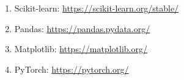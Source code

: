 \documentclass[12pt, a4paper]{article}
\begin{document}
\begin{enumerate}
  \item Scikit-learn: \href{https://scikit-learn.org/stable/}{https://scikit-learn.org/stable/}
  \item Pandas: \href{https://pandas.pydata.org/}{https://pandas.pydata.org/}
  \item Matplotlib: \href{https://matplotlib.org/}{https://matplotlib.org/}
  \item PyTorch: \href{https://pytorch.org/}{https://pytorch.org/}
\end{enumerate}

\end{document}
